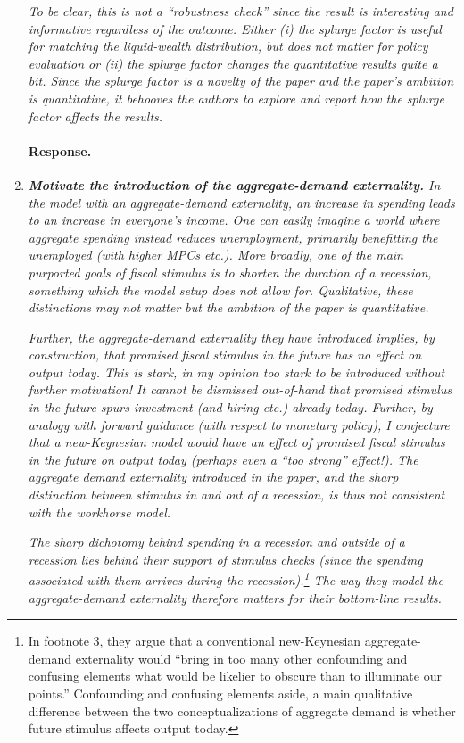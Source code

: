 \documentclass[12pt,letterpaper,english]{article}
\begin{document}
\begin{enumerate}
	\textit{To be clear, this is not a “robustness check” since the result is interesting and informative regardless of the outcome. Either (i) the splurge factor is useful for matching the liquid-wealth distribution, but does not matter for policy evaluation or (ii) the splurge factor changes the	quantitative results quite a bit. Since the splurge factor is a novelty	of the paper and the paper’s ambition is quantitative, it behooves the authors to explore and report how the splurge factor affects the results. }
	
	\paragraph{Response.} 

	\item \textit{\textbf{Motivate the introduction of the aggregate-demand externality.}  In the model with an aggregate-demand externality, an increase in spending leads to an increase in everyone’s income. One can easily imagine a world where aggregate spending instead reduces unemployment, primarily benefitting the unemployed (with higher MPCs etc.). More broadly, one of the main purported goals of fiscal stimulus is to shorten the duration of a recession, something which the model setup does not allow for. Qualitative, these distinctions may not matter but the ambition	of the paper is quantitative.}
	
	\textit{Further, the aggregate-demand externality they have introduced implies,	by construction, that promised fiscal stimulus in the future has no effect on output today. This is stark, in my opinion too stark to be introduced without further motivation! It cannot be dismissed out-of-hand that promised stimulus in the future spurs investment (and hiring etc.) already today. Further, by analogy with forward guidance (with respect to monetary policy), I conjecture that a new-Keynesian model would have an effect of promised fiscal stimulus in the future on output today (perhaps even a ``too strong'' effect!). The aggregate demand externality introduced in the paper, and the sharp distinction	between stimulus in and out of a recession, is thus not consistent with	the workhorse model.}
	
	\textit{The sharp dichotomy behind spending in a recession and outside of a recession lies behind their support of stimulus checks (since the spending	associated with them arrives during the recession).\footnote{In footnote 3, they argue that a conventional new-Keynesian aggregate-demand externality would ``bring in too many other confounding and confusing elements what would be likelier to obscure than to illuminate our points.'' Confounding and confusing elements aside, a main qualitative difference between the two conceptualizations of aggregate demand is whether future stimulus affects output today.} The way they model the aggregate-demand externality therefore matters for their bottom-line results.}
	

\end{enumerate}
\end{document}

